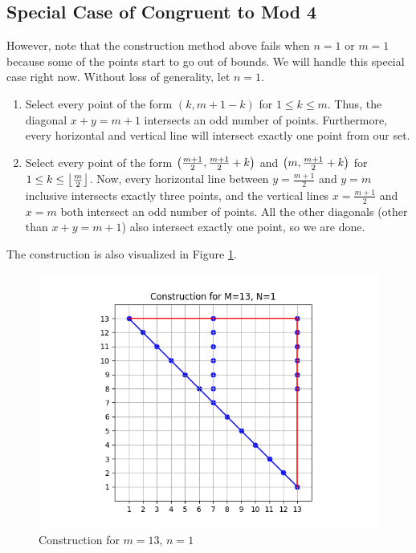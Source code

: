 \documentclass[10pt]{../usamts}
\begin{document}
\begin{solution}
\clearpage
\section*{Special Case of Congruent to Mod 4}

However, note that the construction method above fails when $n=1$ or $m=1$ because some of the points start to go out of bounds. We will handle this special case right now. Without loss of generality, let $n=1$.

\begin{enumerate}
    \item Select every point of the form $(k,m+1-k)$ for $1 \le k \le m$. Thus, the diagonal $x+y=m+1$ intersects an odd number of points. Furthermore, every horizontal and vertical line will intersect exactly one point from our set.
    \item Select every point of the form $\left( \frac{m+1}{2}, \frac{m+1}{2}+k \right)$ and $\left( m, \frac{m+1}{2}+k \right)$ for $1 \le k \le \left\lfloor \frac{m}{2} \right\rfloor$. Now, every horizontal line between $y=\frac{m+1}{2}$ and $y=m$ inclusive intersects exactly three points, and the vertical lines $x=\frac{m+1}{2}$ and $x=m$ both intersect an odd number of points. All the other diagonals (other than $x+y=m+1$) also intersect exactly one point, so we are done.
\end{enumerate}

The construction is also visualized in Figure \ref{fig:131construct}.

\begin{figure}[ht]
\centering
    \includegraphics[width=12cm]{round2/p5construct/construct_13_1.png}
    \caption{Construction for $m=13$, $n=1$}
    \label{fig:131construct}
\end{figure}
\clearpage 

\end{solution}
\end{document}
